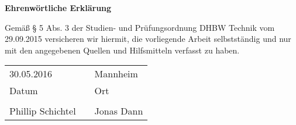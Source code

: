 {\Large \textbf{Ehrenwörtliche Erklärung}}
\vspace{15mm}

Gemäß § 5 Abs. 3 der Studien- und Prüfungsordnung DHBW Technik vom 
29.09.2015 versicheren wir hiermit, die vorliegende Arbeit selbstständig 
und nur mit den angegebenen Quellen und Hilfsmitteln verfasst zu haben.

\vspace{2cm}
\begin{tabular}{p{6cm} p{25mm} p{6cm}}
	30.05.2016 & & Mannheim\\
	\cline{1-1}\cline{3-3}
	Datum &  & Ort  \\
	& & \\[2cm]
	\cline{1-1}\cline{3-3}
	Phillip Schichtel & & Jonas Dann
\end{tabular}